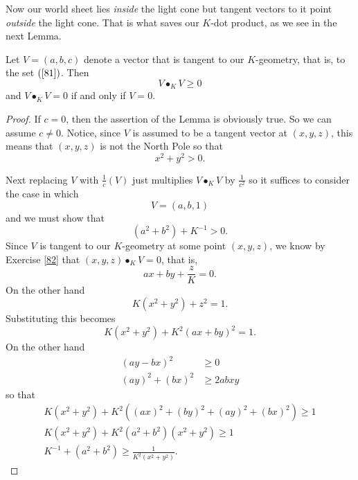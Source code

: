 \documentclass{ximera}
\begin{document}
Now our world sheet lies \textit{inside} the light cone but tangent vectors to
it point \textit{outside} the light cone. That is what saves our $K$-dot
product, as we see in the next Lemma.

\begin{lemma}
Let $V=\left(  a,b,c\right)  $ denote a vector that is tangent
to our $K$-geometry, that is, to the set $\left(  \ref{81}\right)  $. Then%
\[
V\bullet_{K}V\geq0
\]
and $V\bullet_{K}V=0$ if and only if $V=0$.
\end{lemma}

\begin{proof}
If $c=0$, then the assertion of the Lemma is obviously true. So we can assume
$c\neq0$. Notice, since $V$ is assumed to be a tangent vector at $\left(
x,y,z\right)  $, this means that $\left(  x,y,z\right)  $ is not the North
Pole so that
\[
x^{2}+y^{2}>0.
\]


Next replacing $V$ with $\frac{1}{c}\left(  V\right)  $ just multiplies
$V\bullet_{K}V$ by $\frac{1}{c^{2}}$ so it suffices to consider the case in
which%
\[
V=\left(  a,b,1\right)
\]
and we must show that%
\[
\left(  a^{2}+b^{2}\right)  +K^{-1}>0.
\]
Since $V$ is tangent to our $K$-geometry at some point $\left(  x,y,z\right)
$, we know by Exercise \ref{82} that $\left(  x,y,z\right)  \bullet_{K}V=0$,
that is,%
\[
ax+by+\frac{z}{K}=0.
\]
On the other hand%
\[
K\left(  x^{2}+y^{2}\right)  +z^{2}=1.
\]
Substituting this becomes%
\[
K\left(  x^{2}+y^{2}\right)  +K^{2}\left(  ax+by\right)  ^{2}=1.
\]
On the other hand%
\begin{align*}
\left(  ay-bx\right)  ^{2}  &  \geq0\\
\left(  ay\right)  ^{2}+\left(  bx\right)  ^{2}  &  \geq2abxy
\end{align*}
so that%
\begin{gather*}
K\left(  x^{2}+y^{2}\right)  +K^{2}\left(  \left(  ax\right)  ^{2}+\left(
by\right)  ^{2}+\left(  ay\right)  ^{2}+\left(  bx\right)  ^{2}\right)
\geq1\\
K\left(  x^{2}+y^{2}\right)  +K^{2}\left(  a^{2}+b^{2}\right)  \left(
x^{2}+y^{2}\right)  \geq1\\
K^{-1}+\left(  a^{2}+b^{2}\right)  \geq\frac{1}{K^{2}\left(  x^{2}%
+y^{2}\right)  }.
\end{gather*}

\end{proof}
\end{document}
